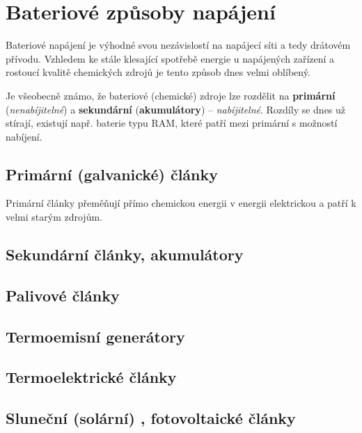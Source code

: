 {  \section{Bateriové způsoby napájení}
    Bateriové napájení je výhodné svou nezávislostí na napájecí síti a tedy drátovém přívodu. 
    Vzhledem ke stále klesající spotřebě energie u napájených zařízení a rostoucí kvalitě 
    chemických zdrojů je tento způsob dnes velmi oblíbený.
   
    Je všeobecně známo, že bateriové (chemické) zdroje lze rozdělit na \textbf{primární} 
    (\emph{nenabíjitelné}) a \textbf{sekundární} (\textbf{a\-ku\-mu\-lá\-to\-ry}) – 
    \emph{nabíjitelné}. Rozdíly se dnes už stírají, existují např. baterie typu RAM,  které patří 
    mezi primární s možností nabíjení.
    
    \subsection{Primární (galvanické) články}
      Primární články přeměňují přímo chemickou energii v energii elektrickou a patří k velmi 
      starým zdrojům.
    \subsection{Sekundární články, akumulátory}
    \subsection{Palivové články}
    \subsection{Termoemisní generátory}
    \subsection{Termoelektrické články}
    \subsection{Sluneční (solární) , fotovoltaické články}
    
} %
\printbibliography[title={Seznam literatury}, heading=subbibliography]
